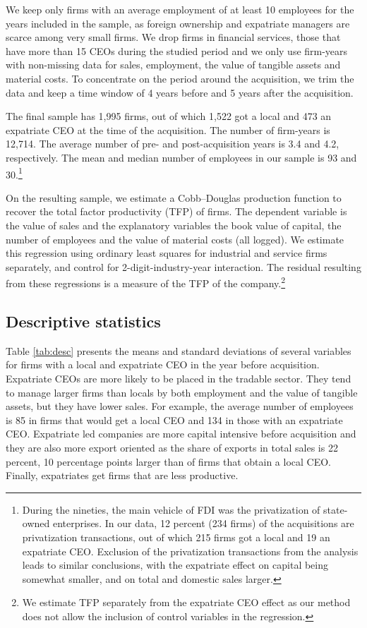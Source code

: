 \documentclass[12pt,a4paper]{article}
\begin{document}
We keep only firms with an average employment of at least 10 employees for the years included in the sample, as foreign ownership and expatriate managers are scarce among very small firms. We drop firms in financial services, those that have more than 15 CEOs during the studied period and we only use firm-years with non-missing data for sales, employment, the value of tangible assets and material costs. To concentrate on the period around the acquisition, we trim the data and keep a time window of 4 years before and 5 years after the acquisition.

The final sample has 1,995 firms, out of which 1,522 got a local and 473 an expatriate CEO at the time of the acquisition. The number of firm-years is 12,714. The average number of pre- and post-acquisition years is 3.4 and 4.2, respectively. The mean and median number of employees in our sample is 93 and 30.\footnote{During the nineties, the main vehicle of FDI was the privatization of state-owned enterprises. In our data, 12 percent (234 firms) of the acquisitions are privatization transactions, out of which 215 firms got a local and 19 an expatriate CEO. Exclusion of the privatization transactions from the analysis leads to similar conclusions, with the expatriate effect on capital being somewhat smaller, and on total and domestic sales larger.}

On the resulting sample, we estimate a Cobb--Douglas production function to recover the total factor productivity (TFP) of firms. The dependent variable is the value of sales and the explanatory variables the book value of capital, the number of employees and the value of material costs (all logged). We estimate this regression using ordinary least squares for industrial and service firms separately, and control for 2-digit-industry-year interaction. The residual resulting from these regressions is a measure of the TFP of the company.\footnote{We estimate TFP separately from the expatriate CEO effect as our method does not allow the inclusion of control variables in the regression.}

\subsection{Descriptive statistics} 

Table \ref{tab:desc} presents the means and standard deviations of several variables for firms with a local and expatriate CEO in the year before acquisition. Expatriate CEOs are more likely to be placed in the tradable sector. They tend to manage larger firms than locals by both employment and the value of tangible assets, but they have lower sales. For example, the average number of employees is 85 in firms that would get a local CEO and 134 in those with an expatriate CEO. Expatriate led companies are more capital intensive before acquisition and they are also more export oriented as the share of exports in total sales is 22 percent, 10 percentage points larger than of firms that obtain a local CEO. Finally, expatriates get firms that are less productive.
\end{document}
